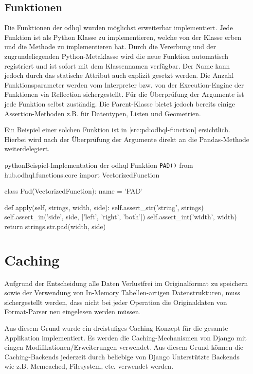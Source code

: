 \subsection{Funktionen}
Die Funktionen der \acs{odhql} wurden möglichst erweiterbar implementiert. Jede Funktion ist als Python Klasse zu implementieren, welche von der Klasse  erben und die Methode  zu implementieren hat. Durch die Vererbung und der zugrundeliegenden Python-Metaklasse wird die neue Funktion automatisch registriert und ist sofort mit dem Klassennamen verfügbar. Der Name kann jedoch durch das statische Attribut  auch explizit gesetzt werden. Die Anzahl Funktionsparameter werden vom Interpreter bzw. von der Execution-Engine der Funktionen via Reflection sichergestellt. Für die Überprüfung der Argumente ist jede Funktion selbst zuständig. Die Parent-Klasse bietet jedoch bereits einige Assertion-Methoden z.B. für Datentypen, Listen und Geometrien.

Ein Beispiel einer solchen Funktion ist in \cref{src:pd:odhql-function} ersichtlich. Hierbei wird nach der Überprüfung der Argumente direkt an die Pandas-Methode  weiterdelegiert.


\begin{srclst}[label=src:pd:odhql-function]{python}{Beispiel-Implementation der \acs{odhql} Funktion \texttt{PAD()}}
from hub.odhql.functions.core import VectorizedFunction

class Pad(VectorizedFunction):
    name = 'PAD'

    def apply(self, strings, width, side):
        self.assert_str('string', strings)
        self.assert_in('side', side, ['left', 'right', 'both'])
        self.assert_int('width', width)
        return strings.str.pad(width, side)
\end{srclst}


\section{Caching}
Aufgrund der Entscheidung alle Daten Verlustfrei im Originalformat zu speichern sowie der Verwendung von In-Memory Tabellen-artigen Datenstrukturen, muss sichergestellt werden, dass nicht bei jeder Operation die Originaldaten von Format-Parser neu eingelesen werden müssen.

Aus diesem Grund wurde ein dreistufiges Caching-Konzept für die gesamte Applikation implementiert. Es werden die Caching-Mechanismen von Django mit eingen Modifikationen/Erweiterungen verwendet. Aus diesem Grund können die Caching-Backends jederzeit durch beliebige von Django Unterstützte Backends wie z.B. Memcached, Filesystem, etc. verwendet werden.

